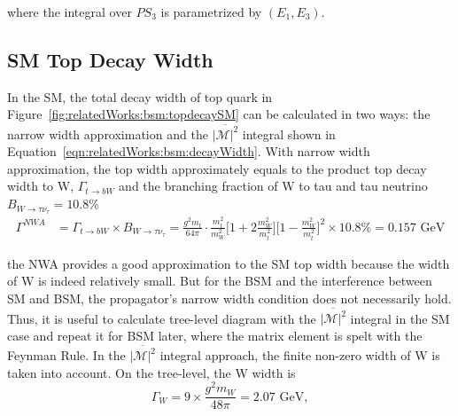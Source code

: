 \noindent where the integral over $PS_3$ is parametrized by  $ ( E_1,E_3 )$.



\subsection{SM Top Decay Width}
\label{sec:relatedWorks:bsm:smTopDecay}

In the SM, the total decay width of top quark in Figure~\ref{fig:relatedWorks:bsm:topdecaySM} can be calculated in two ways: the narrow width approximation and the $\overline{ |\mathcal{M}|^2 } $ integral shown in Equation~\ref{eqn:relatedWorks:bsm:decayWidth}. With narrow width approximation, the top width approximately equals to the product top decay width to W, $\Gamma_{t\to b W}$ and the branching fraction of W to tau and tau neutrino $B_{W\to \tau \nu_\tau} = 10.8\%$
\begin{equation}
\begin{split}
    \Gamma^{NWA} &= \Gamma_{t\to b W} \times B_{W\to \tau \nu_\tau} = \frac{g^2 m_t }{64\pi} \cdot \frac{m_t^2}{m_W^2} \bigg[ 1+2 \frac{m_W^2}{m_t^2}\bigg] \bigg[1-\frac{m_W^2}{m_t^2} \bigg]^2 \times 10.8\%  = 0.157 \text{ GeV}
\end{split}
\label{eqn:relatedWorks:bsm:nwa}
\end{equation}

\noindent the NWA provides a good approximation to the SM top width because the width of W is indeed relatively small. But for the BSM and the interference between SM and BSM, the propagator's narrow width condition  does not necessarily hold. Thus, it is useful to calculate tree-level diagram with the $\overline{ |\mathcal{M}|^2 } $ integral in the SM case and repeat it for BSM later, where the matrix element is spelt with the Feynman Rule.  In the $\overline{ |\mathcal{M}|^2 } $ integral approach, the finite non-zero width of W is taken into account. On the tree-level, the W width is
\begin{equation}
	\Gamma_W = 9 \times \frac{g^2 m_W}{48 \pi} = 2.07 \text{ GeV},
    \label{eqn:relatedWorks:bsm:wWidth}
\end{equation}

